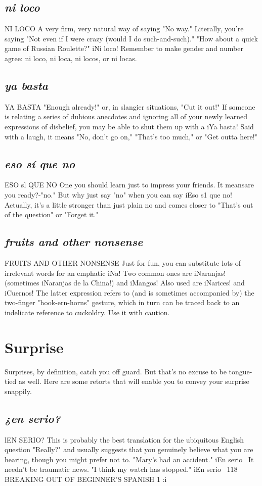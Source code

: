 \subsection{\emph{ni loco}}
NI LOCO
A very firm, very natural way of saying "No way." Literally,
you're saying "Not even if I were crazy (would I do such-and-such)."
"How about a quick game of Russian Roulette?" iNi loco! Remember to make gender and number agree: ni loco, ni loca, ni locos, or
ni locas.
\subsection{\emph{ya basta}}
YA BASTA
"Enough already!" or, in slangier situations, "Cut it out!" If
someone is relating a series of dubious anecdotes and ignoring all of
your newly learned expressions of disbelief, you may be able to shut
them up with a iYa basta! Said with a laugh, it means "No, don't go
on," "That's too much," or "Get outta here!"
\subsection{\emph{eso sí que no}}
ESO sl QUE NO
One you should learn just to impress your friends. It meansare you ready?-"no." But why just say "no" when you can say iEso s1
que no! Actually, it's a little stronger than just plain no and comes
closer to "That's out of the question" or "Forget it."
\subsection{\emph{fruits and other nonsense}}
FRUITS AND OTHER NONSENSE
Just for fun, you can substitute lots of irrelevant words for an
emphatic iNa! Two common ones are iNaranjas! (sometimes iNaranjas de la China!) and iMangos! Also used are iNarices! and iCuernos!
The latter expression refers to (and is sometimes accompanied by) the
two-finger "hook-ern-horns" gesture, which in turn can be traced back
to an indelicate reference to cuckoldry. Use it with caution.

\section{Surprise}

Surprises, by definition, catch you off guard. But that's no excuse to be tongue-tied as well. Here are some retorts that will enable
you to convey your surprise snappily.
\subsection{\emph{¿en serio?}}
lEN SERIO?
This is probably the best translation for the ubiquitous English
question "Really?" and usually suggests that you genuinely believe
what you are hearing, though you might prefer not to. "Mary's had an
accident." iEn serio~ It needn't be traumatic news. "I think my watch
has stopped." iEn serio~
118 BREAKING OUT OF BEGINNER'S SPANISH 1
:i
